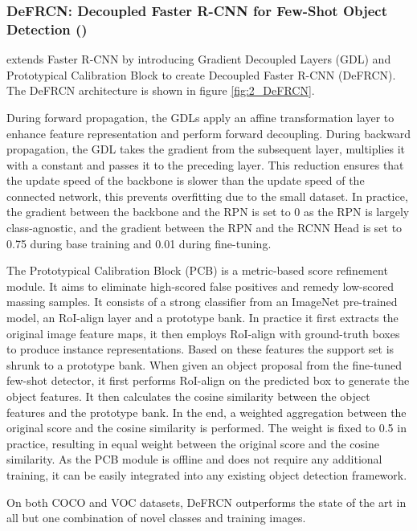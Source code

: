 \subsubsection{DeFRCN: Decoupled Faster R-CNN for Few-Shot Object Detection (\citet{DeFRCN})}
\citet{DeFRCN} extends Faster R-CNN\cite{fasterrcnn} by introducing Gradient Decoupled Layers (GDL) and Prototypical Calibration Block to create Decoupled Faster R-CNN (DeFRCN). The DeFRCN architecture is shown in figure \ref{fig:2_DeFRCN}.

During forward propagation, the GDLs apply an affine transformation layer to enhance feature representation and perform forward decoupling. During backward propagation, the GDL takes the gradient from the subsequent layer, multiplies it with a constant and passes it to the preceding layer. This reduction ensures that the update speed of the backbone is slower than the update speed of the connected network, this prevents overfitting due to the small dataset. In practice, the gradient between the backbone and the RPN is set to 0 as the RPN is largely class-agnostic, and the gradient between the RPN and the RCNN Head is set to 0.75 during base training and 0.01 during fine-tuning.

The Prototypical Calibration Block (PCB) is a metric-based score refinement module. It aims to eliminate high-scored false positives and remedy low-scored massing samples. It consists of a strong classifier from an ImageNet pre-trained model, an RoI-align layer and a prototype bank. In practice it first extracts the original image feature maps, it then employs RoI-align with ground-truth boxes to produce instance representations. Based on these features the support set is shrunk to a prototype bank. When given an object proposal from the fine-tuned few-shot detector, it first performs RoI-align on the predicted box to generate the object features. It then calculates the cosine similarity between the object features and the prototype bank. In the end, a weighted aggregation between the original score and the cosine similarity is performed. The weight is fixed to 0.5 in practice, resulting in equal weight between the original score and the cosine similarity. As the PCB module is offline and does not require any additional training, it can be easily integrated into any existing object detection framework.

On both COCO and VOC datasets, DeFRCN outperforms the state of the art in all but one combination of novel classes and training images.

